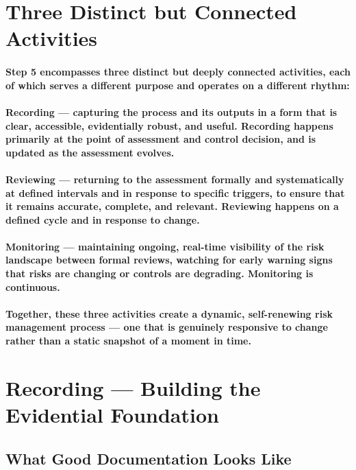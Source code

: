 \section{Three Distinct but Connected Activities}
\paragraph{Step 5 encompasses three distinct but deeply connected activities, each of which serves a different purpose and operates on a different rhythm:}
\paragraph{\textbf{Recording} — capturing the process and its outputs in a form that is clear, accessible, evidentially robust, and useful. Recording happens primarily at the point of assessment and control decision, and is updated as the assessment evolves.}
\paragraph{\textbf{Reviewing} — returning to the assessment formally and systematically at defined intervals and in response to specific triggers, to ensure that it remains accurate, complete, and relevant. Reviewing happens on a defined cycle and in response to change.}
\paragraph{\textbf{Monitoring} — maintaining ongoing, real-time visibility of the risk landscape between formal reviews, watching for early warning signs that risks are changing or controls are degrading. Monitoring is continuous.}
\paragraph{Together, these three activities create a dynamic, self-renewing risk management process — one that is genuinely responsive to change rather than a static snapshot of a moment in time.}

\section{Recording — Building the Evidential Foundation}

\subsection{What Good Documentation Looks Like}
